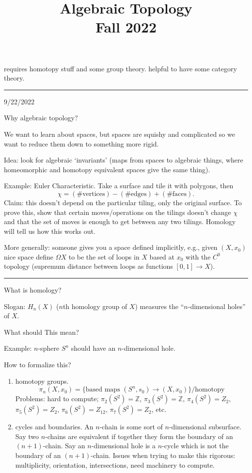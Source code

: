 \documentclass[12pt]{article}
\title{Algebraic Topology \\
    \large Fall 2022
}
\author{}
\date{}
\newcommand{\sepline}{\rule{\textwidth}{0.4pt}}
\theoremstyle{definition}
\newcommand{\Z}{\mathbb{Z}}
\newcommand{\<}{\left\langle}
\renewcommand{\>}{\right\rangle}
\begin{document}
\maketitle

requires homotopy stuff and some group theory.
helpful to have some category theory.

\sepline

9/22/2022

Why algebraic topology?

We want to learn about spaces, but spaces are squishy and complicated so we want to reduce them down to something more rigid.

Idea: look for algebraic `invariants' (maps from spaces to algebraic things, where homeomorphic and homotopy equivalent spaces give the same thing).

Example: Euler Characteristic.
Take a surface and tile it with polygons, then
\[
    \chi = (\#\text{vertices}) - (\#\text{edges}) + (\#\text{faces}).
\]
Claim: this doesn't depend on the particular tiling, only the original surface.
To prove this, show that certain moves/operations on the tilings doesn't change $\chi$ and that the set of moves is enough to get between any two tilings.
Homology will tell us how this works out.

More generally: someone gives you a space defined implicitly, e.g., given $(X, x_0)$ nice space define $\Omega X$ to be the set of loops in $X$ based at $x_0$ with the $C^0$ topology (supremum distance between loops as functions $[0, 1] \to X$).

\sepline

What is homology?

Slogan: $H_n(X)$ ($n$th homology group of $X$) measures the ``$n$-dimensional holes'' of $X$.


What should This mean?

Example: $n$-sphere $S^n$ should have an $n$-dimensional hole.

How to formalize this?
\begin{enumerate}
    \item homotopy groups.
    \[
        \pi_n(X, x_0) = \{\text{based maps } (S^n, s_0) \to (X, x_0)\} / \text{homotopy}
    \]
    Problems: hard to compute; $\pi_2(S^2) = \Z$, $\pi_3(S^2) = \Z$, $\pi_4(S^2) = Z_2$, $\pi_5(S^2) = Z_2$, $\pi_6(S^2) = Z_{12}$, $\pi_7(S^2) = Z_2$, etc.
    \item cycles and boundaries.
    An $n$-chain is some sort of $n$-dimensional subsurface.
    Say two $n$-chains are equivalent if together they form the boundary of an $(n+1)$-chain.
    Say an $n$-dimensional hole is a $n$-cycle which is not the boundary of an $(n+1)$-chain.
    Issues when trying to make this rigorous: multiplicity, orientation, intersections, need machinery to compute.
\end{enumerate}
\end{document}
